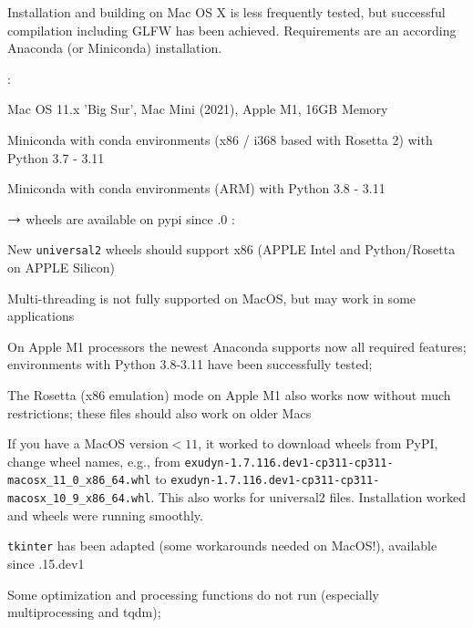 Installation and building on Mac OS X is less frequently tested, but successful compilation including GLFW has been achieved.
Requirements are an according Anaconda (or Miniconda) installation.

\noindent {}:
\bi
  \item Mac OS 11.x 'Big Sur', Mac Mini (2021), Apple M1, 16GB Memory
  \item Miniconda with conda environments (x86 / i368 based with Rosetta 2) with Python 3.7 - 3.11
  \item Miniconda with conda environments (ARM) with Python 3.8 - 3.11
  \item[] $\rightarrow$ wheels are available on pypi since .0 
\ei
\noindent {}:
\bi
  \item New \texttt{universal2} wheels should support x86 (APPLE Intel and Python/Rosetta on APPLE Silicon)
  \item Multi-threading is not fully supported on MacOS, but may work in some applications
  \item On Apple M1 processors the newest Anaconda supports now all required features; environments with Python 3.8-3.11 have been successfully tested;
  \item The Rosetta (x86 emulation) mode on Apple M1 also works now without much restrictions; these files should also work on older Macs
  \item If you have a MacOS version$<11$, it worked to download wheels from PyPI, change wheel names, e.g., from \texttt{exudyn-1.7.116.dev1-cp311-cp311-macosx\_11\_0\_x86\_64.whl} to \texttt{exudyn-1.7.116.dev1-cp311-cp311-macosx\_10\_9\_x86\_64.whl}. This also works for universal2 files. Installation worked and wheels were running smoothly.
  \item \texttt{tkinter} has been adapted (some workarounds needed on MacOS!), available since .15.dev1
  \item Some optimization and processing functions do not run (especially multiprocessing and tqdm); 
\ei

